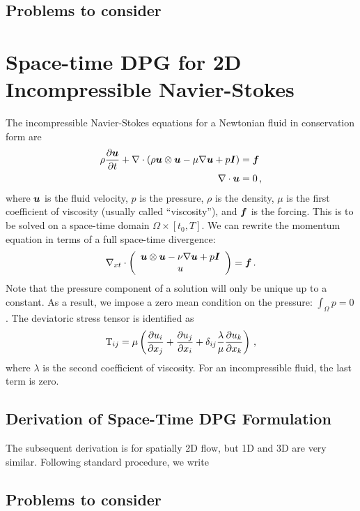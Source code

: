 \documentclass[Proposal.tex]{subfiles}
\begin{document}
\subsection{Problems to consider}

\section{Space-time DPG for 2D Incompressible Navier-Stokes}
The incompressible Navier-Stokes equations for a Newtonian fluid in conservation form are
\begin{align*}
  \rho\frac{\partial\boldsymbol u}{\partial t}+\nabla\cdot\left( \rho\boldsymbol u\otimes\boldsymbol u-\mu\nabla\boldsymbol u+p\boldsymbol I \right)&=\boldsymbol f\\
  \nabla\cdot\boldsymbol u&=0\,,
\end{align*}
where $\boldsymbol u$ is the fluid velocity, $p$ is the pressure, $\rho$ is the density, $\mu$ is the first coefficient of viscosity (usually called ``viscosity''), 
and $\boldsymbol f$ is the forcing. 
This is to be solved on a space-time domain $\Omega\times[t_0,T]$.
We can rewrite the momentum equation in terms of a full space-time divergence:
\begin{equation}
\nabla_{xt}\cdot\left( \begin{array}{c} \boldsymbol u\otimes\boldsymbol u-\nu\nabla\boldsymbol u+p\boldsymbol I\\ u\\ \end{array} \right)=\boldsymbol f\,.
\end{equation}
Note that the pressure component of a solution will only be unique up to a constant. 
As a result, we impose a zero mean condition on the pressure: $\int_\Omega p=0$.
The deviatoric stress tensor is identified as
\begin{equation}
	\mathbb{T}_{ij}=\mu\left( \frac{\partial u_i}{\partial x_j}+\frac{\partial u_j}{\partial x_i}
	+\delta_{ij}\frac{\lambda}{\mu}\frac{\partial u_k}{\partial x_k} \right)\,,
\end{equation}
where $\lambda$ is the second coefficient of viscosity.
For an incompressible fluid, the last term is zero.

\subsection{Derivation of Space-Time DPG Formulation}
The subsequent derivation is for spatially 2D flow, but 1D and 3D are very similar.
Following standard procedure, we write

\subsection{Problems to consider}
\end{document}
